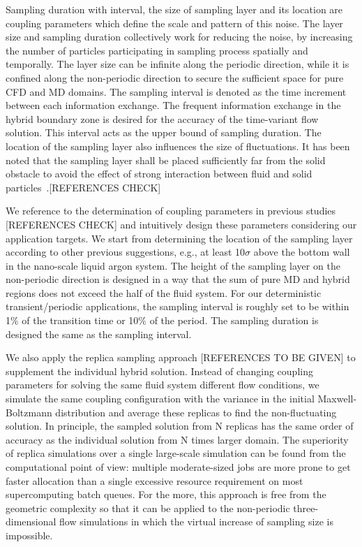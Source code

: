 \documentclass[preprint,12pt]{elsarticle}
\begin{document}
Sampling duration with interval, the size of sampling layer and its location are coupling parameters which define the scale and pattern of this noise. The layer size and sampling duration collectively work for reducing the noise, by increasing the number of particles participating in sampling process spatially and temporally. The layer size can be infinite along the periodic direction, while it is confined along the non-periodic direction to secure the sufficient space for pure CFD and MD domains. The sampling interval is denoted as the time increment between each information exchange. The frequent information exchange in the hybrid boundary zone is desired for the accuracy of the time-variant flow solution. This interval acts as the upper bound of sampling duration. The location of the sampling layer also influences the size of fluctuations. It has been noted that the sampling layer shall be placed sufficiently far from the solid obstacle to avoid the effect of strong interaction between fluid and solid particles~\cite{Liu,Werder}.[REFERENCES CHECK] 

We reference to the determination of coupling parameters in previous studies~\cite{Yen,Liu, Hadjicon1,Hadjicon2,Hadjicon3,Werder,Kotsalis, Flekkoy,Wagner, Delgado1, USHER, Time_Mechanism,Giupponi,Chimera}  [REFERENCES CHECK] and intuitively design these parameters considering our application targets. We start from determining the location of the sampling layer according to other previous suggestions, e.g., at least 10$\sigma$ above the bottom wall in the nano-scale liquid argon system. The height of the sampling layer on the non-periodic direction is designed in a way that the sum of pure MD and hybrid regions does not exceed the half of the fluid system. For our deterministic transient/periodic applications, the sampling interval is roughly set to be within 1\% of the transition time or 10\% of the period. The sampling duration is designed the same as the sampling interval.

We also apply the replica sampling approach [REFERENCES TO BE GIVEN] to supplement the individual hybrid solution. Instead of changing coupling parameters for solving the same fluid system different flow conditions, we simulate the same coupling configuration with the variance in the initial Maxwell-Boltzmann distribution and average these replicas to find the non-fluctuating solution. In principle, the sampled solution from N replicas has the same order of accuracy as the individual solution from N times larger domain. The superiority of replica simulations over a single large-scale simulation can be found from the computational point of view: multiple moderate-sized jobs are more prone to get faster allocation than a single excessive resource requirement on most supercomputing batch queues. For the more, this approach is free from the geometric complexity so that it can be applied to the non-periodic three-dimensional flow simulations in which the virtual increase of sampling size is impossible.
\end{document}
